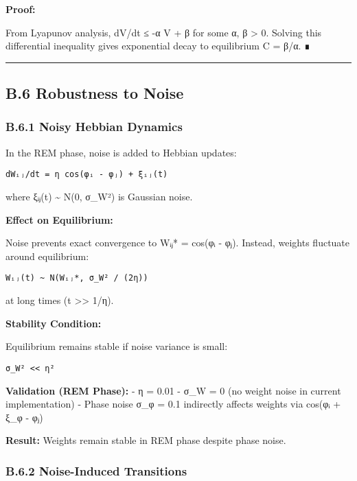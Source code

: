 \documentclass[
]{article}
\begin{document}
\textbf{Proof:}

From Lyapunov analysis, dV/dt ≤ -α V + β for some α, β \textgreater{} 0.
Solving this differential inequality gives exponential decay to
equilibrium C = β/α. ∎

\begin{center}\rule{0.5\linewidth}{0.5pt}\end{center}

\subsection{B.6 Robustness to Noise}\label{b.6-robustness-to-noise}

\subsubsection{B.6.1 Noisy Hebbian
Dynamics}\label{b.6.1-noisy-hebbian-dynamics}

In the REM phase, noise is added to Hebbian updates:

\begin{verbatim}
dWᵢⱼ/dt = η cos(φᵢ - φⱼ) + ξᵢⱼ(t)
\end{verbatim}

where ξᵢⱼ(t) \textasciitilde{} N(0, σ\_W²) is Gaussian noise.

\textbf{Effect on Equilibrium:}

Noise prevents exact convergence to Wᵢⱼ* = cos(φᵢ - φⱼ). Instead,
weights fluctuate around equilibrium:

\begin{verbatim}
Wᵢⱼ(t) ~ N(Wᵢⱼ*, σ_W² / (2η))
\end{verbatim}

at long times (t \textgreater\textgreater{} 1/η).

\textbf{Stability Condition:}

Equilibrium remains stable if noise variance is small:

\begin{verbatim}
σ_W² << η²
\end{verbatim}

\textbf{Validation (REM Phase):} - η = 0.01 - σ\_W = 0 (no weight noise
in current implementation) - Phase noise σ\_φ = 0.1 indirectly affects
weights via cos(φᵢ + ξ\_φ - φⱼ)

\textbf{Result:} Weights remain stable in REM phase despite phase noise.

\subsubsection{B.6.2 Noise-Induced
Transitions}\label{b.6.2-noise-induced-transitions}
\end{document}

